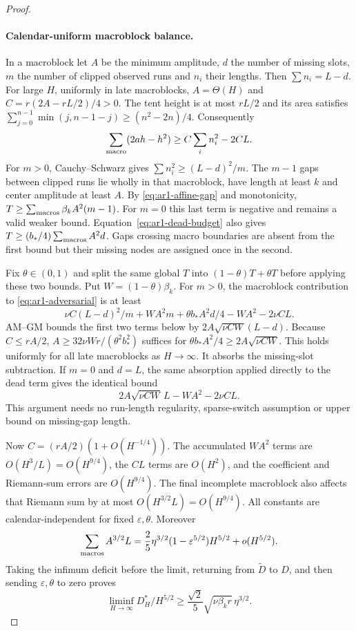 \begin{proof}
\paragraph{Calendar-uniform macroblock balance.}
In a macroblock let $A$ be the minimum amplitude, $d$ the number of missing
slots, $m$ the number of clipped observed runs and $n_i$ their lengths.
Then $\sum n_i=L-d$. For large $H$, uniformly in late macroblocks,
$A=\Theta(H)$ and
$C=r(2A-rL/2)/4>0$.
The tent height is at most $rL/2$ and its area satisfies
$\sum_{j=0}^{n-1}\min(j,n-1-j)\ge(n^2-2n)/4$. Consequently
\begin{equation}\label{eq:ar1-tent-area}
 \sum_{\rm macro}(2ah-h^2)\ge C\sum_i n_i^2-2CL.
\end{equation}
For $m>0$, Cauchy--Schwarz gives $\sum n_i^2\ge(L-d)^2/m$.
The $m-1$ gaps between clipped runs lie wholly in that macroblock, have
length at least $k$ and center amplitude at least $A$. By
\eqref{eq:ar1-affine-gap} and monotonicity,
$T\ge\sum_{\rm macros}\beta_kA^2(m-1)$.
For $m=0$ this last term is negative and remains a valid weaker bound.
Equation~\eqref{eq:ar1-dead-budget} also gives
$T\ge(b_*/4)\sum_{\rm macros}A^2d$.
Gaps crossing macro boundaries are absent from the first bound but their
missing nodes are assigned once in the second.

Fix $\theta\in(0,1)$ and split the same global $T$ into
$(1-\theta)T+\theta T$ before applying these two bounds.
Put $W=(1-\theta)\beta_k$. For $m>0$, the macroblock contribution to
\eqref{eq:ar1-adversarial} is at least
\[
 \nu C(L-d)^2/m+WA^2m+\theta b_*A^2d/4-WA^2-2\nu CL.
\]
AM--GM bounds the first two terms below by
$2A\sqrt{\nu CW}(L-d)$. Because $C\le rA/2$,
$A\ge32\nu Wr/(\theta^2b_*^2)$ suffices for
$\theta b_*A^2/4\ge2A\sqrt{\nu CW}$.
This holds uniformly for all late macroblocks as $H\to\infty$.
It absorbs the missing-slot subtraction. If $m=0$ and $d=L$, the same
absorption applied directly to the dead term gives the identical bound
\begin{equation}\label{eq:ar1-macro-bound}
 2A\sqrt{\nu CW}\,L-WA^2-2\nu CL.
\end{equation}
This argument needs no run-length regularity, sparse-switch assumption or
upper bound on missing-gap length.

Now $C=(rA/2)(1+O(H^{-1/4}))$. The accumulated $WA^2$ terms are
$O(H^3/L)=O(H^{9/4})$, the $CL$ terms are $O(H^2)$, and the coefficient and
Riemann-sum errors are $O(H^{9/4})$. The final incomplete macroblock also
affects that Riemann sum by at most $O(H^{3/2}L)=O(H^{9/4})$.
All constants are calendar-independent for fixed $\varepsilon,\theta$.
Moreover
\[
 \sum_{\rm macros}A^{3/2}L=
 \frac25\eta^{3/2}(1-\varepsilon^{5/2})H^{5/2}+o(H^{5/2}).
\]
Taking the infimum deficit before the limit, returning from
$\widetilde D$ to $D$, and then sending $\varepsilon,\theta$ to zero proves
\begin{equation}\label{eq:ar1-converse-final}
 \liminf_{H\to\infty}D_H^*/H^{5/2}
 \ge\frac{\sqrt2}{5}\sqrt{\nu\beta_k r}\,\eta^{3/2}.
\end{equation}


\end{proof}
